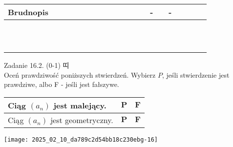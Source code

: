 \documentclass[10pt]{article}
\begin{document}
\begin{center}
\begin{tabular}{|c|c|c|c|c|c|c|c|c|c|c|c|c|c|c|c|c|c|c|c|c|c|c|}
\hline
\multicolumn{4}{|l|}{Brudnopis} &  &  &  &  &  &  &  &  &  &  &  &  & - &  & - &  &  &  &  \\
\hline
 &  &  &  &  &  &  &  &  &  &  &  &  &  &  &  &  &  &  &  &  &  &  \\
\hline
 &  &  &  &  &  &  &  &  &  &  &  &  &  &  &  &  &  &  &  &  &  &  \\
\hline
 &  &  &  &  &  &  &  &  &  &  &  &  &  &  &  &  &  &  &  &  &  &  \\
\hline
 &  &  &  &  &  &  &  &  &  &  &  &  &  &  &  &  &  &  &  &  &  &  \\
\hline
 &  &  &  &  &  &  &  &  &  &  &  &  &  &  &  &  &  &  &  &  &  &  \\
\hline
 &  &  &  &  &  &  &  &  &  &  &  &  &  &  &  &  &  &  &  &  &  &  \\
\hline
 &  &  &  &  &  &  &  &  &  &  &  &  &  &  &  &  &  &  &  &  &  &  \\
\hline
 &  &  &  &  &  &  &  &  &  &  &  &  &  &  &  &  &  &  &  &  &  &  \\
\hline
 &  &  &  &  &  &  &  &  &  &  &  &  &  &  &  &  &  &  &  &  &  &  \\
\hline
 &  &  &  &  &  &  &  &  &  &  &  &  &  &  &  &  &  &  &  &  &  &  \\
\hline
 &  &  &  &  &  &  &  &  &  &  &  &  &  &  &  &  &  &  &  &  &  &  \\
\hline
\end{tabular}
\end{center}

Zadanie 16.2. (0-1) 띠\\
Oceń prawdziwość poniższych stwierdzeń. Wybierz \(P\), jeśli stwierdzenie jest prawdziwe, albo F - jeśli jest fałszywe.

\begin{center}
\begin{tabular}{|l|c|c|}
\hline
Ciąg \(\left(a_{n}\right)\) jest malejący. & \(\mathbf{P}\) & \(\mathbf{F}\) \\
\hline
Ciąg \(\left(a_{n}\right)\) jest geometryczny. & \(\mathbf{P}\) & \(\mathbf{F}\) \\
\hline
\end{tabular}
\end{center}

\begin{center}
\texttt{[image: 2025\_02\_10\_da789c2d54bb18c230ebg-16]}
\end{center}
\end{document}
